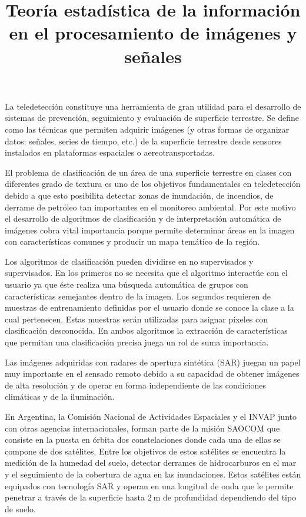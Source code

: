 \documentclass[12pt]{article}
\title{\textbf{Teoría estadística de la información \\en el procesamiento de imágenes y señales}}
\date{}
\begin{document}
	
	\maketitle

La teledetección constituye una herramienta de gran utilidad para el desarrollo
de sistemas de prevención, seguimiento y evaluación de superficie terrestre.
Se define como las técnicas que permiten adquirir imágenes (y otras formas de
organizar datos: señales, series de tiempo, etc.) de la superficie terrestre desde
sensores instalados en plataformas espaciales o aereotransportadas.

El problema de clasificación de un área de una superficie terrestre en clases con diferentes grado de textura es uno de los objetivos fundamentales en teledetección debido a que esto posibilita detectar zonas de inundación, de incendios, de derrame de petróleo tan importantes en el monitoreo ambiental. Por este motivo el desarrollo de algoritmos de clasificación y de interpretación automática de imágenes cobra vital importancia  porque permite determinar áreas en la imagen con características comunes  y producir un mapa temático de la región. 

Los algoritmos de clasificación pueden dividirse en no supervisados y supervisados. En los primeros no se necesita que el algoritmo interactúe con el usuario ya que éste realiza una búsqueda automática de grupos con características semejantes dentro de la imagen. Los segundos requieren de muestras de entrenamiento definidas por el usuario donde se conoce la clase a la cual pertenecen. Estas muestras serán utilizadas para asignar píxeles con clasificación desconocida. En ambos algoritmos la extracción de características que permitan una clasificación precisa juega un rol de suma importancia.


Las imágenes adquiridas con radares de apertura sintética (SAR) juegan un papel muy importante en el sensado remoto debido a su capacidad de obtener imágenes de alta resolución y de operar en forma independiente de las condiciones climáticas y de la iluminación. 

En Argentina, la Comisión Nacional de Actividades Espaciales y el INVAP junto con otras agencias internacionales, forman parte de la misión SAOCOM que consiste en la puesta en órbita dos constelaciones donde cada una de ellas se compone de dos satélites. Entre los objetivos de estos satélites se encuentra la medición de la humedad del suelo, detectar derrames de hidrocarburos en el mar y el seguimiento de la cobertura de agua en las inundaciones. Estos satélites están equipados con tecnología SAR y operan en una longitud de onda que le permite penetrar a través de la
superficie hasta $\SI{2}{\meter}$ de profundidad dependiendo del tipo de suelo.
\end{document}
